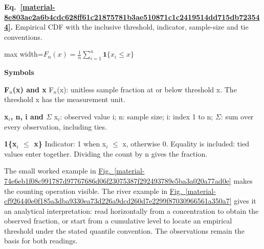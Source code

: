 \documentclass[11pt,a4paper]{article}
\begin{document}
\par\medskip
\noindent\begin{minipage}{\linewidth}
\label{material-8e803ae2a6b4cdc628ff61c21875781b3ae510871c1c2419514dd715db723544}
\noindent\textbf{Eq.~\ref*{material-8e803ae2a6b4cdc628ff61c21875781b3ae510871c1c2419514dd715db723544}.} Empirical CDF with the inclusive threshold, indicator, sample-size and tie conventions.\par\nopagebreak
\begin{center}\begin{adjustbox}{max width=\linewidth}$\displaystyle F_n(x)=\frac1n\sum_{i=1}^{n}\mathbf{1}\{x_i\le x\}$\end{adjustbox}\end{center}

\par\noindent\textbf{Symbols}

\par\noindent\textbf{F\ensuremath{{}_n}(x) and x} F\ensuremath{{}_n}(x): unitless sample fraction at or below threshold x. The threshold x has the measurement unit.

\par\noindent\textbf{x\ensuremath{{}_i}, n, i and \ensuremath{\Sigma}} x\ensuremath{{}_i}: observed value i; n: sample size; i: index 1 to n; \ensuremath{\Sigma}: sum over every observation, including ties.

\par\noindent\textbf{1\{x\ensuremath{{}_i} \ensuremath{\le} x\}} Indicator: 1 when x\ensuremath{{}_i} \ensuremath{\le} x, otherwise 0. Equality is included: tied values enter together. Dividing the count by n gives the fraction.

\end{minipage}\par
\medskip

The small worked example in \hyperref[material-74e6eb1f08c991787d97767686d06f23075387f292493789e5ba3a020a77ad0e]{Fig.~\ref*{material-74e6eb1f08c991787d97767686d06f23075387f292493789e5ba3a020a77ad0e}} makes the counting operation visible. The river example in \hyperref[material-cf926440e0f185a3dba9330ea73d226a9dcd260d7e2299f87030966561a350a7]{Fig.~\ref*{material-cf926440e0f185a3dba9330ea73d226a9dcd260d7e2299f87030966561a350a7}} gives it an analytical interpretation: read horizontally from a concentration to obtain the observed fraction, or start from a cumulative level to locate an empirical threshold under the stated quantile convention. The observations remain the basis for both readings.
\end{document}
